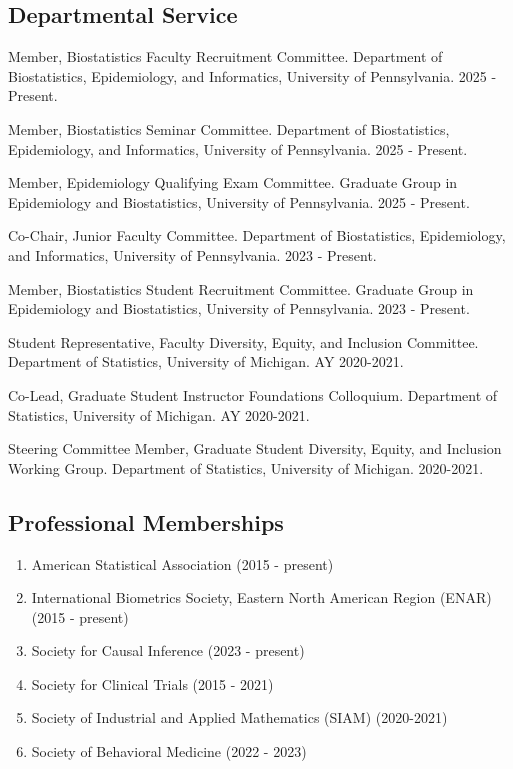 \documentclass[letterpaper,11pt]{article} %
\begin{document}
	\subsection*{Departmental Service}
	\begin{etaremune}
        \item Member, Biostatistics Faculty Recruitment Committee. Department of Biostatistics, Epidemiology, and Informatics, University of Pennsylvania. 2025 - Present.
		\item Member, Biostatistics Seminar Committee. Department of Biostatistics, Epidemiology, and Informatics, University of Pennsylvania. 2025 - Present.
		\item Member, Epidemiology Qualifying Exam Committee. Graduate Group in Epidemiology and Biostatistics, University of Pennsylvania. 2025 - Present.
		\item Co-Chair, Junior Faculty Committee. Department of Biostatistics, Epidemiology, and Informatics, University of Pennsylvania. 2023 - Present.
		\item Member, Biostatistics Student Recruitment Committee. Graduate Group in Epidemiology and Biostatistics, University of Pennsylvania. 2023 - Present.
		\item Student Representative, Faculty Diversity, Equity, and Inclusion Committee. Department of Statistics, University of Michigan. AY 2020-2021.
		\item Co-Lead, Graduate Student Instructor Foundations Colloquium. Department of Statistics, University of Michigan. AY 2020-2021.
		\item Steering Committee Member, Graduate Student Diversity, Equity, and Inclusion Working Group. Department of Statistics, University of Michigan. 2020-2021.
	\end{etaremune}
	
	\subsection*{Professional Memberships}
	\begin{enumerate}[noitemsep, leftmargin = 1.25em]
		\item[] American Statistical Association (2015 - present)
		\item[] International Biometrics Society, Eastern North American Region (ENAR) (2015 - present)
		\item[] Society for Causal Inference (2023 - present)
		\item[] Society for Clinical Trials (2015 - 2021)
		\item[] Society of Industrial and Applied Mathematics (SIAM) (2020-2021)
		\item[] Society of Behavioral Medicine (2022 - 2023)
	\end{enumerate}
	
\end{document}
